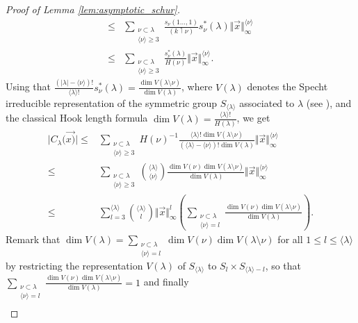\documentclass[10pt,11pt]{amsart}%
\begin{document}
\begin{proof}[Proof of Lemma \ref{lem:asymptotic_schur}]
\begin{align}
\leq &\sum_{\substack{\nu \subset \lambda\\\langle \nu\rangle \geq 3}}\frac{s_{\nu}(1\ldots,1)}{(k\upharpoonleft \nu)}s_{\nu}^*(\lambda)\Vert \vec{x}\Vert_{\infty}^{\langle \nu\rangle }\nonumber\\
\leq&\sum_{\substack{\nu \subset \lambda\\\langle \nu\rangle \geq 3}}\frac{s_{\nu}^*(\lambda)}{H(\nu)}\Vert \vec{x}\Vert_{\infty}^{\langle \nu\rangle }.\nonumber
\end{align}
Using that $\frac{(\vert \lambda \vert -\langle \nu\rangle )!}{\langle \lambda\rangle !}s^*_\nu(\lambda)=\frac{\dim V(\lambda\setminus \nu)}{\dim V(\lambda)}$, where $V(\lambda)$ denotes the Specht irreducible representation of the symmetric group $S_{\langle \lambda\rangle}$ associated to $\lambda$ (see \cite[Eq. 0.14]{OkOl}), and the classical Hook length formula $\dim V(\lambda)=\frac{\langle \lambda\rangle !}{H(\lambda)}$, we get  
\begin{align*}
\vert C_\lambda(\vec{x)}\vert \leq& \sum_{\substack{\nu \subset \lambda\\\langle \nu\rangle \geq 3}}H(\nu)^{-1}\frac{\langle \lambda\rangle !\dim V(\lambda\setminus\nu)}{(\langle \lambda\rangle -\langle \nu\rangle )!\dim V(\lambda)}\Vert \vec{x}\Vert_{\infty}^{\langle \nu\rangle }\\
\leq&\sum_{\substack{\nu \subset \lambda\\\langle \nu\rangle \geq 3}}\binom{\langle \lambda\rangle}{\langle \nu\rangle}\frac{\dim V(\nu)\dim V(\lambda\setminus\nu)}{\dim V(\lambda)}\Vert \vec{x}\Vert_{\infty}^{\langle \nu\rangle }\\
\leq &\sum_{l=3}^{\langle \lambda\rangle}\binom{\langle \lambda\rangle}{l}\Vert \vec{x}\Vert_{\infty}^{l}\left(\sum_{\substack{\nu\subset \lambda\\\langle \nu\rangle=l}}\frac{\dim V(\nu)\dim V(\lambda\setminus\nu)}{\dim V(\lambda)}\right).
\end{align*}
Remark that $\dim V(\lambda)=\sum_{\substack{\nu\subset \lambda\\\langle \nu\rangle=l}}\dim V(\nu)\dim V(\lambda\setminus\nu)$ for all $1\leq l\leq \langle \lambda\rangle$ by restricting the representation $V(\lambda)$ of $S_{\langle \lambda\rangle}$ to $S_{l}\times S_{\langle \lambda\rangle-l}$, so that $\sum_{\substack{\nu\subset \lambda\\\langle \nu\rangle=l}}\frac{\dim V(\nu)\dim V(\lambda\setminus\nu)}{\dim V(\lambda)}=1$ and finally 
\begin{align}

\end{align}
\end{proof}
\end{document}
